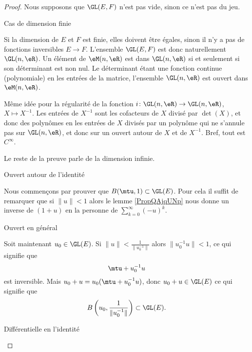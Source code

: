 \begin{proof}
Nous supposons que \( \GL(E,F)\) n'est pas vide, sinon ce n'est pas du jeu.
        \begin{subproof}

        \item[Cas de dimension finie]

            Si la dimension de \( E\) et \( F\) est finie, elles doivent être égales, sinon il n'y a pas de fonctions inversibles \( E\to F\). L'ensemble \( \GL(E,F)\) est donc naturellement \( \GL(n,\eR)\). Un élément de \( \eM(n,\eR)\) est dans \( \GL(n,\eR)\) si et seulement si son déterminant est non nul. Le déterminant étant une fonction continue (polynomiale) en les entrées de la matrice, l'ensemble \( \GL(n,\eR)\) est ouvert dans \( \eM(n,\eR)\).

            Même idée pour la régularité de la fonction \( i\colon \GL(n,\eR)\to \GL(n,\eR)\), \( X\mapsto X^{-1}\). Les entrées de \( X^{-1}\) sont les cofacteurs de \( X\) divisé par \( \det(X)\), et donc des polynômes en les entrées de \( X\) divisés par un polynôme qui ne s'annule pas sur \( \GL(n,\eR)\), et donc sur un ouvert autour de \( X\) et de \( X^{-1}\). Bref, tout est \(  C^{\infty}\).

            Le reste de la preuve parle de la dimension infinie.

        \item[Ouvert autour de l'identité]
            
        Nous commençons par prouver que \( B(\mtu,1)\subset \GL(E)\). Pour cela il suffit de remarquer que si \( \| u \|<1\) alors le lemme \ref{PropQAjqUNp} nous donne un inverse de \( (1+u)\) en la personne de \( \sum_{k=0}^{\infty}(-u)^k\).

    \item[Ouvert en général]

        Soit maintenant \( u_0\in\GL(E)\). Si \( \| u \|<\frac{1}{ \| u_0^{-1} \| }\) alors \( \| u_0^{-1}u \|<1\), ce qui signifie que
        \begin{equation}
            \mtu+u_0^{-1}u
        \end{equation}
    est inversible. Mais \( u_0+u=u_0(\mtu+u_0^{-1}u)\), donc \( u_0+u\in\GL(E)\) ce qui signifie que
    \begin{equation}
    B\left( u_0,\frac{1}{ \| u_0^{-1} \| } \right)\subset \GL(E).
    \end{equation}

    \item[Différentielle en l'identité]


\end{subproof}
\end{proof}
